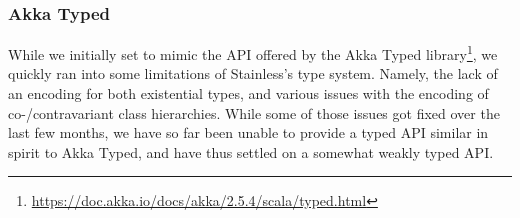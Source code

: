 \documentclass[a4paper,twoside]{article}
\newcommand{\RefFig}[1]{Figure~\ref{#1}}
\newcommand{\stt}[1]{\texttt{\small{#1}}}
\begin{document}
\subsubsection*{Akka Typed}

While we initially set to mimic the API offered by the Akka Typed library\footnote{\url{https://doc.akka.io/docs/akka/2.5.4/scala/typed.html}}, we quickly ran into some limitations of Stainless's type system. Namely, the lack of an encoding for both existential types, and various issues with the encoding of co-/contravariant class hierarchies. While some of those issues got fixed over the last few months, we have so far been unable to provide a typed API similar in spirit to Akka Typed, and have thus settled on a somewhat weakly typed API.

%
\end{document}
